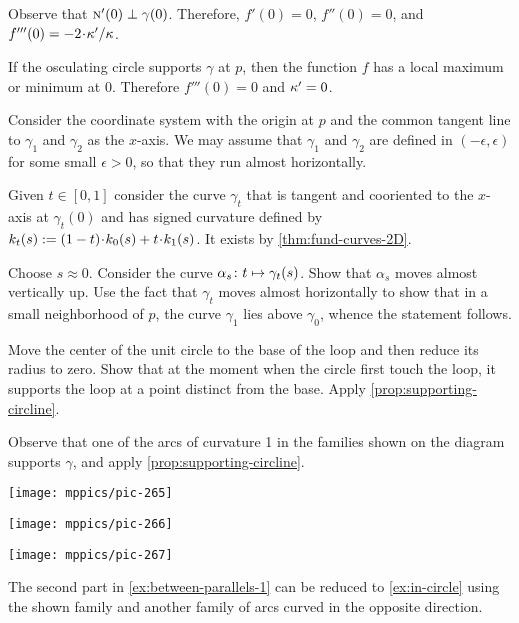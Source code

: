 \begin{multicols}{2}
Observe that $\text{\sc{n}}'(0)\perp\gamma(0)$.
Therefore, $f'(0)=0$, $f''(0)=0$, and $f'''(0)\z=-2\cdot\kur'/\kur$.

If the osculating circle supports $\gamma$ at $p$,
then the function $f$ has a local maximum or minimum at $0$.
Therefore $f'''(0)=0$ and $\kappa'=0$.

Consider the coordinate system with the origin at $p$ and the common tangent line to $\gamma_1$ and $\gamma_2$ as the $x$-axis.
We may assume that $\gamma_1$ and $\gamma_2$ are defined in $(-\epsilon,\epsilon)$ for some small $\epsilon>0$,
so that they run almost horizontally.

Given $t\in[0,1]$ consider the curve $\gamma_t$ that is tangent and cooriented to the $x$-axis at $\gamma_t(0)$ and has signed curvature defined by $\skur_t(s)\z\df(1\z-t)\cdot\skur_0(s)+t\cdot\skur_1(s)$.
It exists by \ref{thm:fund-curves-2D}.

Choose $s\approx 0$.
Consider the curve $\alpha_s\:t\z\mapsto \gamma_t(s)$.
Show that $\alpha_s$ moves almost vertically up.
Use the fact that $\gamma_t$ moves almost horizontally to show that in a small neighborhood of $p$, the curve $\gamma_1$ lies above $\gamma_0$,
whence the statement follows.

 Move the center of the unit circle to the base of the loop and then reduce its radius to zero.
Show that at the moment when the circle first touch the loop, it supports the loop at a point distinct from the base.
Apply \ref{prop:supporting-circline}.


Observe that one of the arcs of curvature 1 in the families shown on the diagram supports $\gamma$, and apply \ref{prop:supporting-circline}.

\begin{Figure}
\begin{minipage}{.35\textwidth}
\centering
\texttt{[image: mppics/pic-265]}
\end{minipage}
\hfill
\begin{minipage}{.3\textwidth}
\centering
\texttt{[image: mppics/pic-266]}
\end{minipage}
\hfill
\begin{minipage}{.25\textwidth}
\centering
\texttt{[image: mppics/pic-267]}
\end{minipage}
\end{Figure}

The second part in \ref{ex:between-parallels-1} can be reduced to \ref{ex:in-circle} using the shown family and another family of arcs curved in the opposite direction.


\end{multicols}
